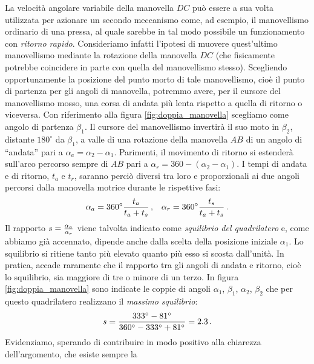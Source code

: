 \noindent La velocit\`a angolare variabile della manovella $DC$ pu\`o essere a
sua volta utilizzata per azionare un secondo meccanismo come, ad esempio, il 
manovellismo ordinario di una pressa, al quale sarebbe in tal modo possibile
un funzionamento con {\em ritorno rapido}.
Consideriamo infatti l'ipotesi di muovere quest'ultimo manovellismo mediante la rotazione della
manovella $DC$ (che fisicamente potrebbe coincidere in parte con quella del manovellismo
stesso). Scegliendo opportunamente la posizione del punto morto di tale manovellismo,
cio\`e il punto di partenza per gli angoli di manovella, potremmo avere, per il
cursore del manovellismo mosso, una corsa di andata pi\`u lenta rispetto a quella di
ritorno o viceversa.
Con riferimento alla figura \ref{fig:doppia_manovella} scegliamo come angolo di
partenza $\beta_1$. Il cursore del manovellismo invertir\`a il suo moto in $\beta_2$,
distante $180^{\circ}$ da $\beta_1$, a valle di una rotazione della
manovella $AB$ di un angolo di ``andata'' pari a
$\alpha_a=\alpha_2-\alpha_1$. Parimenti, il movimento di ritorno si estender\`a
sull'arco percorso sempre di $AB$ pari a
$\alpha_r=360-(\alpha_2-\alpha_1)$.
I tempi di andata e di ritorno, $t_a$ e $t_r$, saranno perci\`o diversi tra loro
e proporzionali ai due angoli percorsi dalla manovella motrice durante le
rispettive fasi:
\begin{equation}
\alpha_a = 360^{\circ} {t_a \over{t_a+t_s}}\,,\;\;\;
\alpha_r = 360^{\circ} {t_s \over{t_a+t_s}}\,.
\label{eq:angoli_andata_ritorno}
\end{equation}
\noindent Il rapporto $s={{\alpha_a}\over{\alpha_r}}$ 
viene talvolta indicato come {\em squilibrio del quadrilatero}
e, come abbiamo gi\`a accennato, dipende anche dalla scelta della
 posizione iniziale
$\alpha_1$. Lo squilibrio si ritiene tanto pi\`u elevato quanto pi\`u
esso si scosta dall'unit\`a.
In pratica, accade raramente che 
il rapporto tra gli angoli di andata e ritorno, cio\`e lo squilibrio, sia maggiore di
tre o minore di un terzo.
In figura \ref{fig:doppia_manovella} sono indicate le coppie di angoli
$\alpha_1$, $\beta_1$, $\alpha_2$, $\beta_2$ che per questo quadrilatero
realizzano il {\em massimo squilibrio}:
\begin{equation}
s={{333^{\circ}-81^{\circ}}\over{360^{\circ} -333^{\circ} +81^{\circ}}} = 2.3\,.
\label{eq:esempio_squilibrio}
\end{equation}
\noindent Evidenziamo, sperando di contribuire in modo positivo alla chiarezza dell'argomento,
che esiste sempre la
